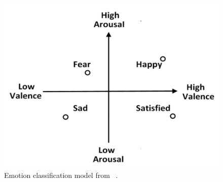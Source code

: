 \begin{figure}[h!t]
    \centering
    \includegraphics[scale=0.45]{images/emotion-classification.png}
    \caption{Emotion classification model from ~\cite{emotion_classification}.}
    \label{fig:emotion_classification}
\end{figure}
